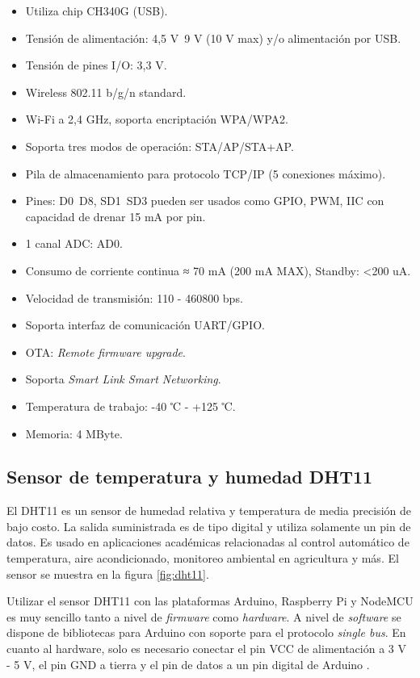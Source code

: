\begin{itemize}
\item Utiliza chip CH340G (USB).
\item Tensión de alimentación: 4,5 V~9 V (10 V max) y/o alimentación por USB.
\item Tensión de pines I/O: 3,3 V.
\item Wireless 802.11 b/g/n standard.
\item Wi-Fi a 2,4 GHz, soporta encriptación WPA/WPA2.
\item Soporta tres modos de operación: STA/AP/STA+AP.
\item Pila de almacenamiento para protocolo TCP/IP (5 conexiones máximo).
\item Pines: D0~D8, SD1~SD3 pueden ser usados como GPIO, PWM, IIC con capacidad de drenar 15 mA por pin.
\item 1 canal ADC: AD0.
\item Consumo de corriente continua ≈ 70 mA (200 mA MAX), Standby: <200 uA.
\item Velocidad de transmisión: 110 - 460800 bps.
\item Soporta interfaz de comunicación UART/GPIO.
\item OTA: \emph{Remote firmware upgrade}.
\item Soporta \emph{Smart Link Smart Networking}.
\item Temperatura de trabajo: -40 ℃ - +125 ℃.
\item Memoria: 4 MByte.
\end{itemize}

\subsection{Sensor de temperatura y humedad DHT11}

El DHT11 es un sensor de humedad relativa y temperatura de media precisión de bajo costo. La salida suministrada es de tipo digital y utiliza solamente un pin de datos. Es usado en aplicaciones académicas relacionadas al control automático de temperatura, aire acondicionado, monitoreo ambiental en agricultura y más. El sensor se muestra en la figura \ref{fig:dht11}.

Utilizar el sensor DHT11 con las plataformas Arduino, Raspberry Pi y NodeMCU es muy sencillo tanto a nivel de \emph{firmware} como \emph{hardware}. A nivel de \emph{software} se dispone de bibliotecas para Arduino con soporte para el protocolo \emph{single bus}. En cuanto al hardware, solo es necesario conectar el pin VCC de alimentación a 3 V - 5 V, el pin GND a tierra y el pin de datos a un pin digital de Arduino \citep{WEBSITE:8}. 

